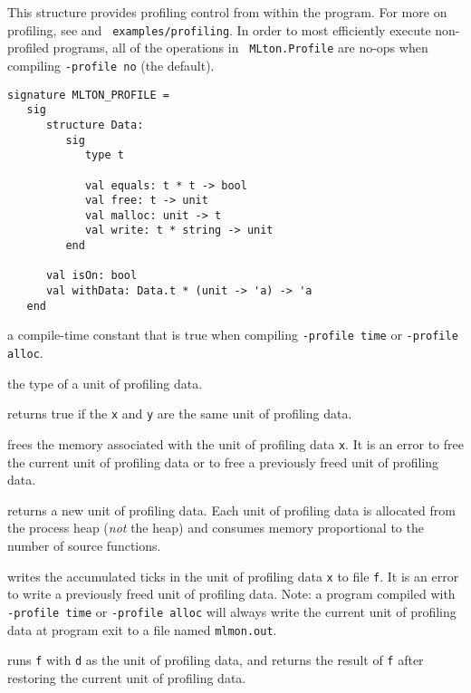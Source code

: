 This structure provides profiling control from within the program.
For more on profiling, see  and {\tt
examples/profiling}. In order to most efficiently execute
non-profiled programs, all of the operations in {\tt
MLton.Profile} are no-ops when compiling {\tt -profile no} (the
default).

\begin{verbatim}
signature MLTON_PROFILE =
   sig
      structure Data:
         sig
            type t

            val equals: t * t -> bool
            val free: t -> unit
            val malloc: unit -> t
            val write: t * string -> unit
         end

      val isOn: bool
      val withData: Data.t * (unit -> 'a) -> 'a
   end
\end{verbatim}

\begin{description}

a compile-time constant that is true when compiling {\tt -profile
time} or {\tt -profile alloc}.

 the type of a unit of profiling data.

returns true if the {\tt x} and {\tt y} are the same unit of profiling
data.

frees the memory associated with the unit of profiling data {\tt x}.
It is an error to free the current unit of profiling data or to free a
previously freed unit of profiling data.

returns a new unit of profiling data.  Each unit of profiling data is
allocated from the process heap (\emph{not} the {\mlton} heap) and
consumes memory proportional to the number of source functions.

writes the accumulated ticks in the unit of profiling data {\tt x} to
file {\tt f}.  It is an error to write a previously freed unit of
profiling data.  Note: a program compiled with {\tt -profile time} or
{\tt -profile alloc} will always write the current unit of profiling
data at program exit to a file named {\tt mlmon.out}.

runs {\tt f} with {\tt d} as the unit of profiling data, and returns
the result of {\tt f} after restoring the current unit of profiling
data.

\end{description}
%
